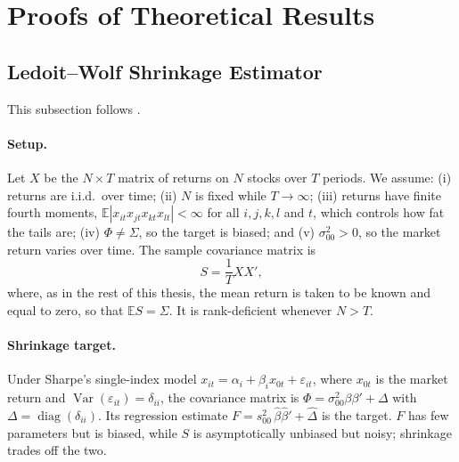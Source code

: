 \section{Proofs of Theoretical Results}

\subsection{Ledoit--Wolf Shrinkage Estimator}

This subsection follows \citet{ledoit2003}.

\paragraph{Setup.}
Let $X$ be the $N \times T$ matrix of returns on $N$ stocks over $T$ periods. We assume: (i) returns are i.i.d.\ over time; (ii) $N$ is fixed while $T \to \infty$; (iii) returns have finite fourth moments, $\mathbb{E}|x_{it}x_{jt}x_{kt}x_{lt}| < \infty$ for all $i,j,k,l$ and $t$, which controls how fat the tails are; (iv) $\Phi \neq \Sigma$, so the target is biased; and (v) $\sigma_{00}^2 > 0$, so the market return varies over time. The sample covariance matrix is
\[
  S = \frac{1}{T} X X',
\]
where, as in the rest of this thesis, the mean return is taken to be known and equal to zero, so that $\mathbb{E}S = \Sigma$. It is rank-deficient whenever $N > T$.

\paragraph{Shrinkage target.}
Under Sharpe's single-index model $x_{it} = \alpha_i + \beta_i x_{0t} + \varepsilon_{it}$, where $x_{0t}$ is the market return and $\operatorname{Var}(\varepsilon_{it}) = \delta_{ii}$, the covariance matrix is $\Phi = \sigma_{00}^2 \beta\beta' + \Delta$ with $\Delta = \operatorname{diag}(\delta_{ii})$. Its regression estimate $F = s_{00}^2\,\hat\beta\hat\beta' + \hat\Delta$ is the target. $F$ has few parameters but is biased, while $S$ is asymptotically unbiased but noisy; shrinkage trades off the two.

